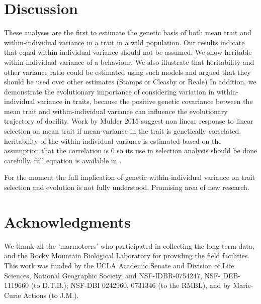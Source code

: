 \documentclass[a4paper,12pt,twoside]{article}
\begin{document}
	\section*{Discussion}
	These analyses are the first to estimate the genetic basis of both mean trait and within-individual variance in a trait in a wild population. 
	Our results indicate that equal within-individual variance should not be assumed.
	We show heritable within-individual variance of a behaviour.
	We also illustrate that heritability and other variance ratio could be estimated using such models and argued that they should be used over other estimates (Stamps or Cleasby or Reale)
	In addition, we demonstrate the evolutionary importance of considering variation in within-individual variance in traits, because the positive genetic covariance between the mean trait and within-individual variance can influence the evolutionary trajectory of docility. 
	Work by Mulder 2015 suggest non linear response to linear selection on mean trait if mean-variance in the trait is genetically correlated.
	heritability of the within-individual variance is estimated based on the assumption that the correlation is 0 so its use in selection analysis should be done carefully.
	full equation is available in \cite{mulder_prediction_2007}.
	 
	For the moment the full implication of genetic within-individual variance on trait selection and evolution is not fully understood. Promising area of new research.
	  
	
	\section*{Acknowledgments}
	We thank all the ‘marmoteers’ who participated in collecting the long-term data, and the Rocky Mountain Biological Laboratory for providing the field facilities. 
	This work was funded by the UCLA Academic Senate and Division of Life Sciences, National Geographic Society, and NSF-IDBR-0754247, NSF- DEB-1119660 (to D.T.B.); NSF-DBI 0242960, 0731346 (to the RMBL), and by Marie-Curie Actions (to J.M.).
	
	
\end{document}
